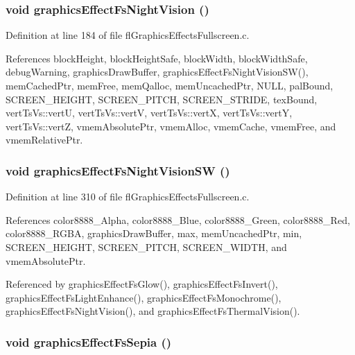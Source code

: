 \subsubsection{\setlength{\rightskip}{0pt plus 5cm}void graphics\-Effect\-Fs\-Night\-Vision ()}\label{flGraphicsEffectsFullscreen_8h_98487e403cf47fa69dcec36d7f272267}




Definition at line 184 of file fl\-Graphics\-Effects\-Fullscreen.c.

References block\-Height, block\-Height\-Safe, block\-Width, block\-Width\-Safe, debug\-Warning, graphics\-Draw\-Buffer, graphics\-Effect\-Fs\-Night\-Vision\-SW(), mem\-Cached\-Ptr, mem\-Free, mem\-Qalloc, mem\-Uncached\-Ptr, NULL, pal\-Bound, SCREEN\_\-HEIGHT, SCREEN\_\-PITCH, SCREEN\_\-STRIDE, tex\-Bound, vert\-Ts\-Vs::vert\-U, vert\-Ts\-Vs::vert\-V, vert\-Ts\-Vs::vert\-X, vert\-Ts\-Vs::vert\-Y, vert\-Ts\-Vs::vert\-Z, vmem\-Absolute\-Ptr, vmem\-Alloc, vmem\-Cache, vmem\-Free, and vmem\-Relative\-Ptr.
\subsubsection{\setlength{\rightskip}{0pt plus 5cm}void graphics\-Effect\-Fs\-Night\-Vision\-SW ()}\label{flGraphicsEffectsFullscreen_8h_eff760794c3e2f70e05c99cb308ebc94}




Definition at line 310 of file fl\-Graphics\-Effects\-Fullscreen.c.

References color8888\_\-Alpha, color8888\_\-Blue, color8888\_\-Green, color8888\_\-Red, color8888\_\-RGBA, graphics\-Draw\-Buffer, max, mem\-Uncached\-Ptr, min, SCREEN\_\-HEIGHT, SCREEN\_\-PITCH, SCREEN\_\-WIDTH, and vmem\-Absolute\-Ptr.

Referenced by graphics\-Effect\-Fs\-Glow(), graphics\-Effect\-Fs\-Invert(), graphics\-Effect\-Fs\-Light\-Enhance(), graphics\-Effect\-Fs\-Monochrome(), graphics\-Effect\-Fs\-Night\-Vision(), and graphics\-Effect\-Fs\-Thermal\-Vision().
\subsubsection{\setlength{\rightskip}{0pt plus 5cm}void graphics\-Effect\-Fs\-Sepia ()}\label{flGraphicsEffectsFullscreen_8h_57c69a455a44486ab5be74117bc36604}




